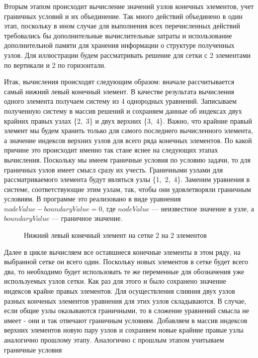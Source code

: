 \documentclass[12pt, a4paper]{article}
\begin{document}
Вторым этапом происходит вычисление значений узлов конечных элементов, учет граничных условий и их объединение. Так много действий объединено в один этап, поскольку в ином случае для выполнения всех перечисленных действий требовались бы дополнительные вычислительные затраты и использование дополнительной памяти для хранения информации о структуре полученных узлов. Для иллюстрации будем рассматривать решение для сетки с 2 элементами по вертикали и 2 по горизонтали.

Итак, вычисления происходят следующим образом: вначале рассчитывается самый нижний левый конечный элемент. В качестве результата вычисления одного элемента получаем систему из 4 однородных уравнений. Записываем полученную систему в массив решений и сохраняем данные об индексах двух крайних правых узлах \{2,~3\} и двух верхних \{3,~4\}. Важно, что крайние правый элемент мы будем хранить только для самого последнего вычисленного элемента, а значение индексов верхних узлов для всего ряда конечных элементов. По какой причине это происходит именно так стане яснее на следующих этапах вычисления. Поскольку мы имеем граничные условия по условию задачи, то для граничных узлов имеет смысл сразу их учесть. Граничными узлами для рассматриваемого элемента будут являться узлы \{1,~2,~4\}. Заменим уравнения в системе, соответствующие этим узлам, так, чтобы они удовлетворяли граничным условиям. В программе это реализовано в виде уравнения $nodeValue - boundaryValue = 0$, где $nodeValue$ --- неизвестное значение в узле, а $boundaryValue$ --- граничное значение. 
\begin{figure}[!htbp]
	\caption{Нижний левый конечный элемент на сетке 2 на 2 элементов}
	\label{left-bottom-el}
\end{figure}

Далее в цикле вычисляем все оставшиеся конечные элементы в этом ряду, на выбранной сетке он всего один. Поскольку новых элементов в сетке будет всего два, то необходимо будет использовать те же переменные для обозначения уже используемых узлов сетки. Как раз для этого и было сохранено значение индексов крайне правых элементов. Для осуществления слияния двух узлов разных конченых элементов уравнения для этих узлов складываются. В случае, если общие узлы оказываются граничными, то в сложение уравнений смысла не имеет - они и так отвечают граничным условиям. Добавляем в массив индексов верхних элементов новую пару узлов и сохраняем новые крайние правые узлы аналогично прошлому этапу. Аналогично с прошлым этапом учитываем граничные условия
\end{document}
